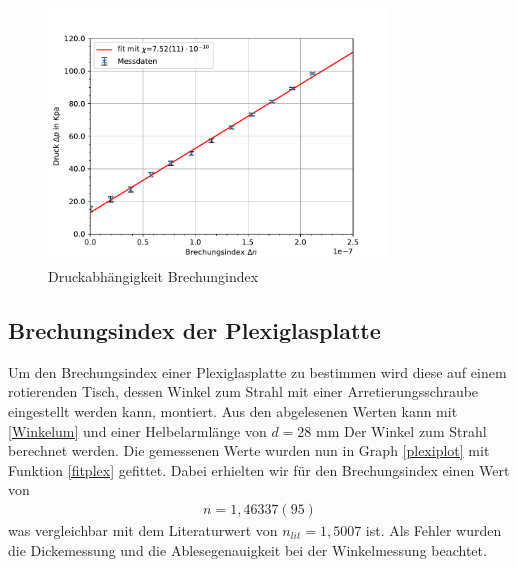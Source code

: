 \documentclass[11pt, a4paper]{article}
\begin{document}
    \begin{figure}
        \centering
        \includegraphics[width=0.8\textwidth]{./plots/druck.pdf}
        \caption{Druckabhängigkeit Brechungindex}
        \label{fig:druck}
    \end{figure}

    \subsection{Brechungsindex der Plexiglasplatte}
    Um den Brechungsindex einer Plexiglasplatte zu bestimmen wird diese auf einem rotierenden Tisch, dessen Winkel zum Strahl mit einer Arretierungsschraube eingestellt werden kann, montiert.
    Aus den abgelesenen Werten kann mit \ref{Winkelum} und einer Helbelarmlänge von $d = 28$ mm Der Winkel zum Strahl berechnet werden.
    Die gemessenen Werte wurden nun in Graph \ref{plexiplot} mit Funktion \ref{fitplex} gefittet. Dabei erhielten wir für den Brechungsindex einen Wert von
    \begin{align}
        n = 1,46337(95)
    \end{align}
    was vergleichbar mit dem Literaturwert von $n_{lit} = 1,5007$ \cite[Siehe:]{refdat} ist. Als Fehler wurden die Dickemessung und die  Ablesegenauigkeit bei der Winkelmessung beachtet.
\end{document}

